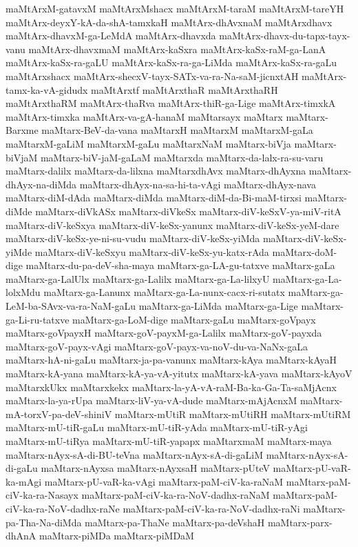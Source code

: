 {maMtArxM-gatavxM
maMtArxMshacx
maMtArxM-taraM
maMtArxM-tareYH
maMtArx-deyxY-kA-da-shA-tamxkaH
maMtArx-dhAvxnaM
maMtArxdhavx
maMtArx-dhavxM-ga-LeMdA
maMtArx-dhavxda
maMtArx-dhavx-du-tapx-tayx-vanu
maMtArx-dhavxmaM
maMtArx-kaSxra
maMtArx-kaSx-raM-ga-LanA
maMtArx-kaSx-ra-gaLU
maMtArx-kaSx-ra-ga-LiMda
maMtArx-kaSx-ra-gaLu
maMtArxshacx
maMtArx-shecxV-tayx-SATx-va-ra-Na-saM-jicnxtAH
maMtArx-tamx-ka-vA-gidudx
maMtArxtf
maMtArxthaR
maMtArxthaRH
maMtArxthaRM
maMtArx-thaRva
maMtArx-thiR-ga-Lige
maMtArx-timxkA
maMtArx-timxka
maMtArx-va-gA-hanaM
maMtarsayx
maMtarx
maMtarx-Barxme
maMtarx-BeV-da-vana
maMtarxH
maMtarxM
maMtarxM-gaLa
maMtarxM-gaLiM
maMtarxM-gaLu
maMtarxNaM
maMtarx-biVja
maMtarx-biVjaM
maMtarx-biV-jaM-gaLaM
maMtarxda
maMtarx-da-lalx-ra-su-varu
maMtarx-dalilx
maMtarx-da-lilxna
maMtarxdhAvx
maMtarx-dhAyxna
maMtarx-dhAyx-na-diMda
maMtarx-dhAyx-na-sa-hi-ta-vAgi
maMtarx-dhAyx-nava
maMtarx-diM-dAda
maMtarx-diMda
maMtarx-diM-da-Bi-maM-tirxsi
maMtarx-diMde
maMtarx-diVkASx
maMtarx-diVkeSx
maMtarx-diV-keSxV-ya-miV-ritA
maMtarx-diV-keSxya
maMtarx-diV-keSx-yanunx
maMtarx-diV-keSx-yeM-dare
maMtarx-diV-keSx-ye-ni-su-vudu
maMtarx-diV-keSx-yiMda
maMtarx-diV-keSx-yiMde
maMtarx-diV-keSxyu
maMtarx-diV-keSx-yu-katx-rAda
maMtarx-doM-dige
maMtarx-du-pa-deV-sha-maya
maMtarx-ga-LA-gu-tatxve
maMtarx-gaLa
maMtarx-ga-LalUlx
maMtarx-ga-Lalilx
maMtarx-ga-La-lilxyU
maMtarx-ga-La-lolxMdu
maMtarx-ga-Lanunx
maMtarx-ga-La-nunx-cacx-ri-sutatx
maMtarx-ga-LeM-ba-SAvx-va-ra-NaM-gaLu
maMtarx-ga-LiMda
maMtarx-ga-Lige
maMtarx-ga-Li-ru-tatxve
maMtarx-ga-LoM-dige
maMtarx-gaLu
maMtarx-goVpayx
maMtarx-goVpayxH
maMtarx-goV-payxM-ga-Lalilx
maMtarx-goV-payxda
maMtarx-goV-payx-vAgi
maMtarx-goV-payx-va-noV-du-va-NaNx-gaLa
maMtarx-hA-ni-gaLu
maMtarx-ja-pa-vanunx
maMtarx-kAya
maMtarx-kAyaH
maMtarx-kA-yana
maMtarx-kA-ya-vA-yitutx
maMtarx-kA-yava
maMtarx-kAyoV
maMtarxkUkx
maMtarxkekx
maMtarx-la-yA-vA-raM-Ba-ka-Ga-Ta-saMjAcnx
maMtarx-la-ya-rUpa
maMtarx-liV-ya-vA-dude
maMtarx-mAjAcnxM
maMtarx-mA-torxV-pa-deV-shiniV
maMtarx-mUtiR
maMtarx-mUtiRH
maMtarx-mUtiRM
maMtarx-mU-tiR-gaLu
maMtarx-mU-tiR-yAda
maMtarx-mU-tiR-yAgi
maMtarx-mU-tiRya
maMtarx-mU-tiR-yapapx
maMtarxmaM
maMtarx-maya
maMtarx-nAyx-sA-di-BU-teVna
maMtarx-nAyx-sA-di-gaLiM
maMtarx-nAyx-sA-di-gaLu
maMtarx-nAyxsa
maMtarx-nAyxsaH
maMtarx-pUteV
maMtarx-pU-vaR-ka-mAgi
maMtarx-pU-vaR-ka-vAgi
maMtarx-paM-ciV-ka-raNaM
maMtarx-paM-ciV-ka-ra-Nasayx
maMtarx-paM-ciV-ka-ra-NoV-dadhx-raNaM
maMtarx-paM-ciV-ka-ra-NoV-dadhx-raNe
maMtarx-paM-ciV-ka-ra-NoV-dadhx-raNi
maMtarx-pa-Tha-Na-diMda
maMtarx-pa-ThaNe
maMtarx-pa-deVshaH
maMtarx-parx-dhAnA
maMtarx-piMDa
maMtarx-piMDaM
}
